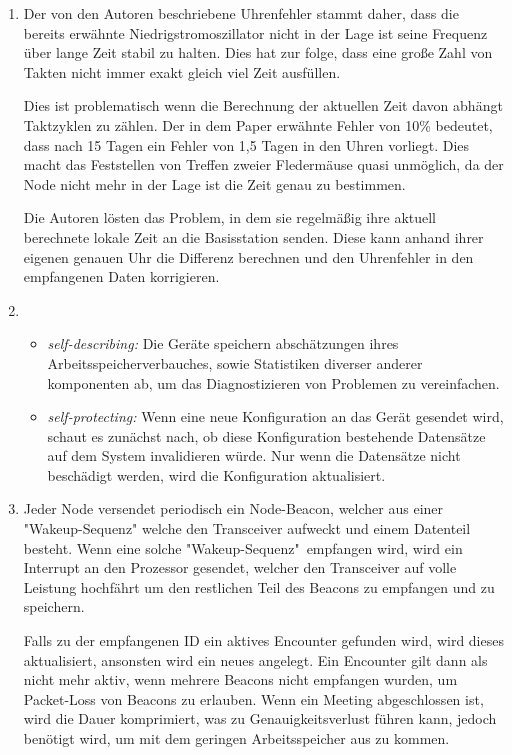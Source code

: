 \begin{enumerate}
        \item Der von den Autoren beschriebene Uhrenfehler stammt daher, dass die bereits erwähnte Niedrigstromoszillator nicht in der Lage ist seine Frequenz über lange Zeit stabil zu halten. Dies hat zur folge, dass eine große Zahl von Takten nicht immer exakt gleich viel Zeit ausfüllen.

        Dies ist problematisch wenn die Berechnung der aktuellen Zeit davon abhängt Taktzyklen zu zählen. Der in dem Paper erwähnte Fehler von 10\% bedeutet, dass nach 15 Tagen ein Fehler von 1,5 Tagen in den Uhren vorliegt. Dies macht das Feststellen von Treffen zweier Fledermäuse quasi unmöglich, da der Node nicht mehr in der Lage ist die Zeit genau zu bestimmen.

        Die Autoren lösten das Problem, in dem sie regelmäßig ihre aktuell berechnete lokale Zeit an die Basisstation senden. Diese kann anhand ihrer eigenen genauen Uhr die Differenz berechnen und den Uhrenfehler in den empfangenen Daten korrigieren.

        \item \begin{itemize}
            \item \emph{self-describing:} Die Geräte speichern abschätzungen ihres Arbeitsspeicherverbauches, sowie Statistiken diverser anderer komponenten ab, um das Diagnostizieren von Problemen zu vereinfachen.
            \item \emph{self-protecting:} Wenn eine neue Konfiguration an das Gerät gesendet wird, schaut es zunächst nach, ob diese Konfiguration bestehende Datensätze auf dem System invalidieren würde. Nur wenn die Datensätze nicht beschädigt werden, wird die Konfiguration aktualisiert.
        \end{itemize}

        \item Jeder Node versendet periodisch ein Node-Beacon, welcher aus einer "Wakeup-Sequenz" welche den Transceiver aufweckt und einem Datenteil besteht. Wenn eine solche "Wakeup-Sequenz"\, empfangen wird, wird ein Interrupt an den Prozessor gesendet, welcher den Transceiver auf volle Leistung hochfährt um den restlichen Teil des Beacons zu empfangen und zu speichern.

        Falls zu der empfangenen ID ein aktives Encounter gefunden wird, wird dieses aktualisiert, ansonsten wird ein neues angelegt. Ein Encounter gilt dann als nicht mehr aktiv, wenn mehrere Beacons nicht empfangen wurden, um Packet-Loss von Beacons zu erlauben. Wenn ein Meeting abgeschlossen ist, wird die Dauer komprimiert, was zu Genauigkeitsverlust führen kann, jedoch benötigt wird, um mit dem geringen Arbeitsspeicher aus zu kommen.

    \end{enumerate}
